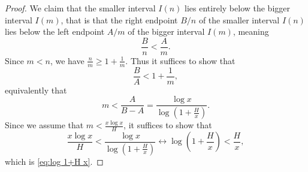 \documentclass[10pt,a4paper]{amsart}
\begin{document}
 \begin{proof}
We claim that  the smaller interval $I(n)$ lies entirely below the bigger interval $I(m)$, that is that  the right  endpoint $ B/n$ of the smaller interval $I(n)$  lies below the left endpoint $A/m$ of the bigger interval $I(m)$, 
meaning 
$$\frac Bn<\frac Am.
$$   
Since $m<n$, we have 
$\frac{n}{m}\ge 1+\frac{1}{m}$. 
Thus it suffices to show that
$$
\frac{B}{A}<1+\frac{1}{m},
$$
equivalently that 
$$
m<\frac{A}{B-A}= \frac{\log x}{ \log\left( 1+\frac Hx \right)} .
$$
Since we assume that $m<\frac{x\log x}{H}$, it suffices to show that 
\[
\frac {x\log x}H<\frac{\log x}{ \log\left( 1+\frac Hx \right)} \longleftrightarrow 
\log\left( 1+\frac Hx \right) <\frac Hx, 
\]
which  is \eqref{eq:log 1+H x}. 
\end{proof}
\end{document}
